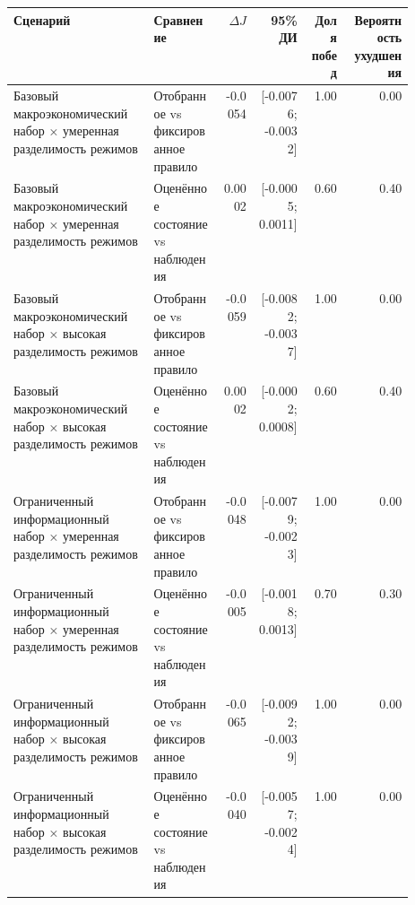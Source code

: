 \begin{tabular}{p{0.35\linewidth}p{0.17\linewidth}rrrr}
\toprule
Сценарий & Сравнение & $\Delta J$ & 95\% ДИ & Доля побед & Вероятность ухудшения \\
\midrule
Базовый макроэкономический набор × умеренная разделимость режимов & Отобранное vs фиксированное правило & -0.0054 & [-0.0076; -0.0032] & 1.00 & 0.00 \\
Базовый макроэкономический набор × умеренная разделимость режимов & Оценённое состояние vs наблюдения & 0.0002 & [-0.0005; 0.0011] & 0.60 & 0.40 \\
Базовый макроэкономический набор × высокая разделимость режимов & Отобранное vs фиксированное правило & -0.0059 & [-0.0082; -0.0037] & 1.00 & 0.00 \\
Базовый макроэкономический набор × высокая разделимость режимов & Оценённое состояние vs наблюдения & 0.0002 & [-0.0002; 0.0008] & 0.60 & 0.40 \\
Ограниченный информационный набор × умеренная разделимость режимов & Отобранное vs фиксированное правило & -0.0048 & [-0.0079; -0.0023] & 1.00 & 0.00 \\
Ограниченный информационный набор × умеренная разделимость режимов & Оценённое состояние vs наблюдения & -0.0005 & [-0.0018; 0.0013] & 0.70 & 0.30 \\
Ограниченный информационный набор × высокая разделимость режимов & Отобранное vs фиксированное правило & -0.0065 & [-0.0092; -0.0039] & 1.00 & 0.00 \\
Ограниченный информационный набор × высокая разделимость режимов & Оценённое состояние vs наблюдения & -0.0040 & [-0.0057; -0.0024] & 1.00 & 0.00 \\
\bottomrule
\end{tabular}
